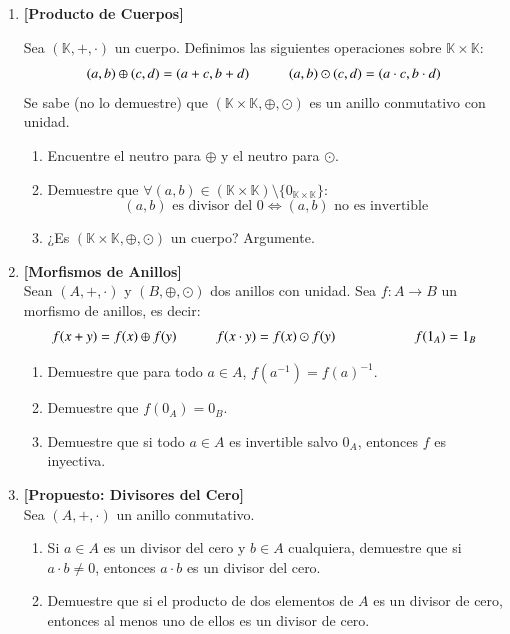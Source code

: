 \documentclass[letterpaper,10pt]{article}
\newcommand{\K}{\mathbb K}
\theoremstyle{plain}
\begin{document}
\begin{enumerate}[\bf P1.]
    \item \textbf{[Producto de Cuerpos]}
    
    Sea $(\K, + , \cdot)$ un cuerpo. Definimos las siguientes operaciones sobre $\K \times \K$:
        $$
        (a,b)\oplus (c,d)=(a+c,b+d) \hspace{10 mm} (a,b) \odot (c,d) = (a\cdot c, b\cdot d )
        $$
        Se sabe (no lo demuestre) que $(\K \times \K, \oplus , \odot )$ es un anillo conmutativo con unidad.
        \begin{enumerate}
        	\item Encuentre el neutro para $\oplus$ y el neutro para $\odot$.
        	\item Demuestre que $\forall (a,b) \in( \K \times \K )\setminus \{0_{\K\times \K}\}$:
        	$$
        	(a,b) \text{ es divisor del 0} \iff (a,b) \text{ no es invertible}  
        	$$
        	\item ¿Es $(\K \times \K, \oplus , \odot )$ un cuerpo? Argumente.
        \end{enumerate}

    \item \textbf{[Morfismos de Anillos]} \\
    Sean $(A,+,\cdot)$ y $(B,\oplus, \odot)$ dos anillos con unidad. Sea $f: A \to B$ un morfismo de anillos, es decir:
    $$	f(x+ y)=f(x)\oplus f(y) \hspace{10 mm} f(x \cdot y)=f(x ) \odot f(y) \hspace{10 mm} \hspace{10 mm} f(1_A)=1_B $$
        \begin{enumerate} 
            \item Demuestre que para todo $a \in A$, $f(a^{-1})=f(a)^{-1}$.  
            \item Demuestre que $f(0_A)=0_B$.
            \item Demuestre que si todo $a \in A$ es invertible salvo $0_A$, entonces $f$ es inyectiva.
        \end{enumerate}
        \newpage 
    \item \textbf{[Propuesto: Divisores del Cero]}\\
    Sea $(A,+,\cdot)$ un anillo conmutativo.
        \begin{enumerate}
        	\item Si $a\in A$ es un divisor del cero y $b\in A$ cualquiera, demuestre que si $a\cdot b\neq 0$, entonces $a\cdot b$ es un divisor del cero.
        	\item Demuestre que si el producto de dos elementos de $A$ es un divisor de cero, entonces al menos uno de ellos es un divisor de cero. 
        \end{enumerate}
    

\end{enumerate}
\end{document}
